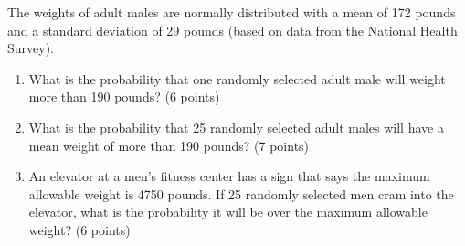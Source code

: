 

\item The weights of adult males are normally distributed with a mean of 172 
pounds and a standard deviation of 29 pounds (based on data from the National
Health Survey). 

\begin{enumerate}
\item What is the probability that one randomly selected adult male will weight 
more than 190 pounds? (6 points)

\vfill
\vfill

\item What is the probability that 25 randomly selected adult males will have a 
mean weight of more than 190 pounds? (7 points)


\vfill
\vfill
\vfill

\item An elevator at a men's fitness center has a sign that says the maximum 
allowable weight is 4750 pounds. If 25 randomly selected men cram into the 
elevator, what is the probability it will be over the maximum allowable weight? 
(6 points)


\vfill
\vfill

\end{enumerate}